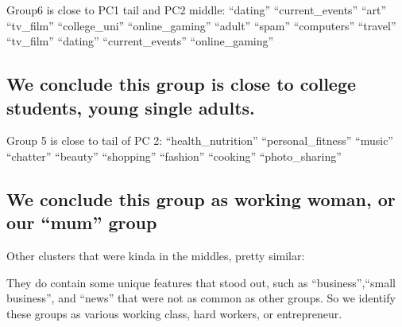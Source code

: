 \documentclass[]{article}
\begin{document}
Group6 is close to PC1 tail and PC2 middle: ``dating''
``current\_events'' ``art'' ``tv\_film'' ``college\_uni''
``online\_gaming'' ``adult'' ``spam'' ``computers'' ``travel''
``tv\_film'' ``dating'' ``current\_events'' ``online\_gaming''

\hypertarget{we-conclude-this-group-is-close-to-college-students-young-single-adults.}{%
\subsection{We conclude this group is close to college students, young
single
adults.}\label{we-conclude-this-group-is-close-to-college-students-young-single-adults.}}

Group 5 is close to tail of PC 2: ``health\_nutrition''
``personal\_fitness'' ``music'' ``chatter'' ``beauty'' ``shopping''
``fashion'' ``cooking'' ``photo\_sharing''

\hypertarget{we-conclude-this-group-as-working-woman-or-our-mum-group}{%
\subsection{We conclude this group as working woman, or our ``mum''
group}\label{we-conclude-this-group-as-working-woman-or-our-mum-group}}

Other clusters that were kinda in the middles, pretty similar:

They do contain some unique features that stood out, such as
``business'',``small business'', and ``news'' that were not as common as
other groups. So we identify these groups as various working class, hard
workers, or entrepreneur.
\end{document}
